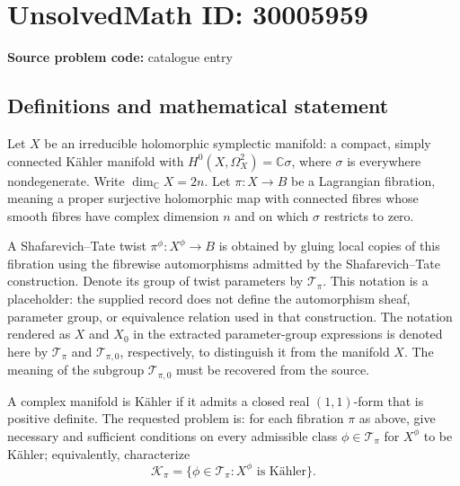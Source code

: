 \documentclass[11pt]{article}
\newcommand{\C}{\mathbb{C}}
\begin{document}
\section*{UnsolvedMath ID: 30005959}
\textbf{Source problem code:} catalogue entry
\subsection{Definitions and mathematical statement}
Let \(X\) be an irreducible holomorphic symplectic manifold: a compact, simply connected K\"ahler manifold with \(H^0(X,\Omega_X^2)=\C\sigma\), where \(\sigma\) is everywhere nondegenerate. Write \(\dim_{\C}X=2n\). Let \(\pi:X\to B\) be a Lagrangian fibration, meaning a proper surjective holomorphic map with connected fibres whose smooth fibres have complex dimension \(n\) and on which \(\sigma\) restricts to zero.

A Shafarevich--Tate twist \(\pi^{\phi}:X^{\phi}\to B\) is obtained by gluing local copies of this fibration using the fibrewise automorphisms admitted by the Shafarevich--Tate construction. Denote its group of twist parameters by \(\mathcal T_{\pi}\). This notation is a placeholder: the supplied record does not define the automorphism sheaf, parameter group, or equivalence relation used in that construction. The notation rendered as \(X\) and \(X_0\) in the extracted parameter-group expressions is denoted here by \(\mathcal T_{\pi}\) and \(\mathcal T_{\pi,0}\), respectively, to distinguish it from the manifold \(X\). The meaning of the subgroup \(\mathcal T_{\pi,0}\) must be recovered from the source.

A complex manifold is K\"ahler if it admits a closed real \((1,1)\)-form that is positive definite. The requested problem is: for each fibration \(\pi\) as above, give necessary and sufficient conditions on every admissible class \(\phi\in\mathcal T_{\pi}\) for \(X^{\phi}\) to be K\"ahler; equivalently, characterize
\[
\mathcal K_{\pi}=\{\phi\in\mathcal T_{\pi}:X^{\phi}\text{ is K\"ahler}\}.
\]
\end{document}
